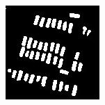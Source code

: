 \documentclass{kththesis}
\begin{document}
\begin{figure}[H]
\endminipage\hfill
{}%
  \includegraphics[width=\linewidth]{class_vs_w/weight_1}
\endminipage
\caption{}
\end{figure}
\end{document}
